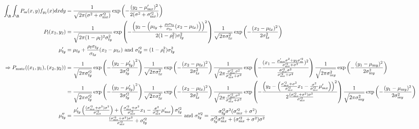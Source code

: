 \documentclass{article}\usepackage[]{graphicx}\usepackage[]{color}
\newcommand{\x}[1]{\text{#1}}
\begin{document}
\begin{landscape}
\begin{align*}
\\\int_\R\int_\R P_\x{m}(x,y)f_{y_2}(x)dxdy&=\frac{1}{\sqrt{2\pi(\sigma^2+\sigma_{\x{m}x}'^2)}}\exp\left(-\frac{(y_2-\mu_{\x{m}x}')^2}{2(\sigma^2+\sigma_{\x{m}x}'^2)}\right)
\\ P_\x{f}(x_2,y_2)&=\frac{1}{\sqrt{2\pi(1-\rho_\x{f})^2\sigma_{\x{f}y}^2}}\exp\left(-\frac{\left(y_2-\left(\mu_{\x{f}y}+\frac{\rho_\x{f}\sigma_{\x{f}y}}{\sigma_{\x{f}x}}(x_2-\mu_{\x{f}x})\right)\right)^2}{2(1-\rho_\x{f}^2)\sigma_{\x{f}y}^2}\right)\frac{1}{\sqrt{2\pi\sigma_{\x{f}x}^2}}\exp\left(-\frac{(x_2-\mu_{\x{f}x})^2}{2\sigma_{\x{f}x}^2}\right)
\\ \mu_{\x{f}y}'&=\mu_{\x{f}y}+\frac{\rho_\x{f}\sigma_{\x{f}y}}{\sigma_{\x{f}x}}(x_2-\mu_{\x{f}x}) \text{ and } \sigma_{\x{f}y}'^2=(1-\rho_\x{f}^2)\sigma_{\x{f}y}^2
\\\Rightarrow P_\x{mate}((x_1,y_1),(x_2,y_2))&=\frac{1}{\sqrt{2\pi\sigma_{\x{f}y}'^2}}\exp\left(-\frac{\left(y_2-\mu_{\x{f}y}'\right)^2}{2\sigma_{\x{f}y}'^2}\right)\frac{1}{\sqrt{2\pi\sigma_{\x{f}x}^2}}\exp\left(-\frac{(x_2-\mu_{\x{f}x})^2}{2\sigma_{\x{f}x}^2}\right)\frac{1}{\sqrt{2\pi\frac{\sigma_{\x{m}x}'^2\sigma^2}{\sigma_{\x{m}x}'^2+\sigma^2}}}\exp\left(-\frac{(x_1-\frac{\mu_{\x{m}x}'\sigma^2+y_2\sigma_\x{m}'^2}{\sigma_{\x{m}x}'^2+\sigma^2})^2}{\frac{\sigma_{\x{m}x}'^2\sigma^2}{\sigma_{\x{m}x}'^2+\sigma^2}}\right)\frac{1}{\sqrt{2\pi\sigma_{\x{m}y}^2}}\exp\left(-\frac{(y_1-\mu_{\x{m}y})^2}{2\sigma_{\x{m}y}^2}\right)
\\&=\frac{1}{\sqrt{2\pi\sigma_{\x{f}y}'^2}}\exp\left(-\frac{\left(y_2-\mu_{\x{f}y}'\right)^2}{2\sigma_{\x{f}y}'^2}\right)\frac{1}{\sqrt{2\pi\sigma_{\x{f}x}^2}}\exp\left(-\frac{(x_2-\mu_{\x{f}x})^2}{2\sigma_{\x{f}x}^2}\right)\frac{1}{\sqrt{2\pi\frac{\sigma_{\x{m}x}'^2\sigma^2}{\sigma_{\x{m}x}'^2+\sigma^2}}}\exp\left(-\frac{\left(y_2-\left(\frac{\sigma_{\x{m}x}'^2+\sigma^2}{\sigma_{\x{m}x}'^2}x_1-\frac{\sigma^2}{\sigma_{\x{m}x}'^2}\mu_{\x{m}x}'\right)\right)^2}{2\frac{(\sigma_{\x{m}x}'^2+\sigma^2)\sigma^2}{\sigma_{\x{m}x}'^2}}\right)\frac{1}{\sqrt{2\pi\sigma_{\x{m}y}^2}}\exp\left(-\frac{(y_1-\mu_{\x{m}y})^2}{2\sigma_{\x{m}y}^2}\right)
\\ \mu_{\x{f}y}''&=\frac{\mu_{\x{f}y}'\left(\frac{(\sigma_{\x{m}x}'^2+\sigma^2)\sigma^2}{\sigma_{\x{m}x}'^2}\right)+\left(\frac{\sigma_{\x{m}x}'^2+\sigma^2}{\sigma_{\x{m}x}'^2}x_1-\frac{\sigma^2}{\sigma_{\x{m}x}'^2}\mu_{\x{m}x}'\right)\sigma_{\x{f}y}'^2}{\frac{(\sigma_{\x{m}x}'^2+\sigma^2)\sigma^2}{\sigma_{\x{m}x}'^2}+\sigma_{\x{f}y}'^2} \text{ and } \sigma_{\x{f}y}''^2=\frac{\sigma_{\x{f}y}'^2\sigma^2(\sigma_{\x{m}x}'^2+\sigma^2)}{\sigma_{\x{f}y}'^2\sigma_{\x{m}x}'^2+(\sigma_{\x{m}x}'^2+\sigma^2)\sigma^2} 
\end{align*}
\end{landscape}
\end{document}
